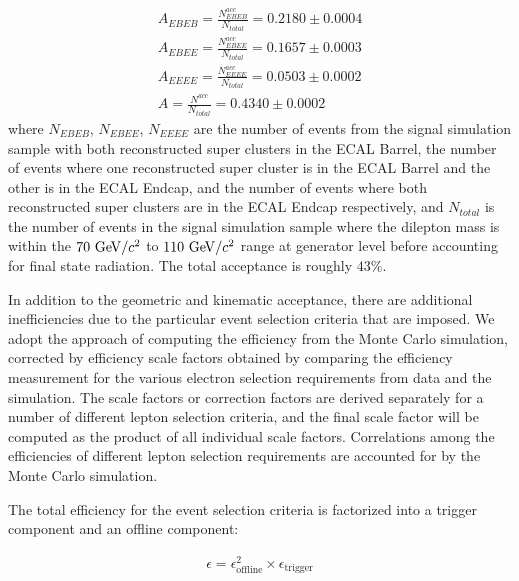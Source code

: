 \documentclass{cmspaper}
\begin{document}
\begin{eqnarray}
  A_{EBEB} = \frac{N_{EBEB}^{acc}}{N_{total}} = 0.2180\pm0.0004 \\ \nonumber
  A_{EBEE} = \frac{N_{EBEE}^{acc}}{N_{total}} = 0.1657\pm0.0003 \\ \nonumber
  A_{EEEE} = \frac{N_{EEEE}^{acc}}{N_{total}} = 0.0503\pm0.0002 \\ \nonumber
  A = \frac{N^{acc}}{N_{total}} = 0.4340\pm0.0002                 
  \label{eqn:acceptance}  
\end{eqnarray}
where $N_{EBEB}$, $N_{EBEE}$, $N_{EEEE}$ are the number of events from the signal simulation sample with both reconstructed super clusters in the ECAL Barrel, the number of events where one reconstructed super cluster is in the ECAL Barrel and the other is in the ECAL Endcap, and the number of events where both reconstructed super clusters are in the ECAL Endcap respectively, and $N_{total}$ is the number of events in the signal simulation sample where the dilepton mass is within the $70\ \GeVcc$ to $110\ \mathrm{Ge\kern -0.1em V/}c^2$ range at generator level before accounting for final state radiation. The total acceptance is roughly $43$\%. 









\label{sec:efficiency}
In addition to the geometric and kinematic acceptance, there are additional inefficiencies due to the particular event selection criteria that are imposed. We adopt the approach of computing the efficiency from the Monte Carlo simulation, corrected by efficiency scale factors obtained by comparing the efficiency measurement for the various electron selection requirements from data and the simulation. The scale factors or correction factors are derived separately for a number of different lepton selection criteria, and the final scale factor will be computed as the product of all individual scale factors. Correlations among the efficiencies of different lepton selection requirements are accounted for by the Monte Carlo simulation.

The total efficiency for the event selection criteria is factorized into a trigger component and an offline component:

\begin{eqnarray}
  \label{eqn:totalEfficiency}  
  \epsilon = \epsilon_{\mathrm{offline}}^{2} \times \epsilon_{\mathrm{trigger}}
\end{eqnarray}
\end{document}
